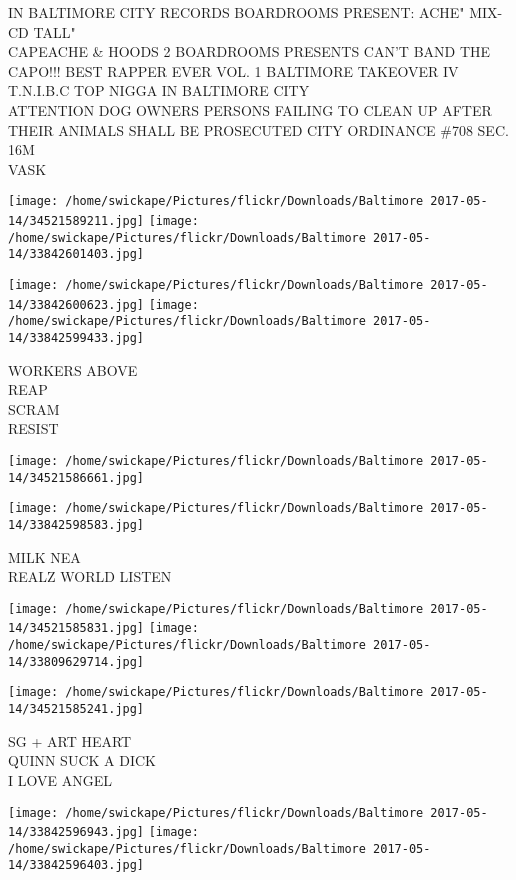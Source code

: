 \documentclass[10pt,letterpaper]{article}
\begin{document}
IN BALTIMORE CITY RECORDS BOARDROOMS PRESENT: ACHE" MIX{-}CD TALL"\\
CAPEACHE \& HOODS 2 BOARDROOMS PRESENTS CAN'T BAND THE CAPO!!! BEST RAPPER EVER VOL. 1 BALTIMORE TAKEOVER IV T.N.I.B.C TOP NIGGA IN BALTIMORE CITY\\
ATTENTION DOG OWNERS PERSONS FAILING TO CLEAN UP AFTER THEIR ANIMALS SHALL BE PROSECUTED CITY ORDINANCE \#708 SEC. 16M\\
VASK
\pagebreak

\texttt{[image: /home/swickape/Pictures/flickr/Downloads/Baltimore 2017-05-14/34521589211.jpg]}
\texttt{[image: /home/swickape/Pictures/flickr/Downloads/Baltimore 2017-05-14/33842601403.jpg]}

\texttt{[image: /home/swickape/Pictures/flickr/Downloads/Baltimore 2017-05-14/33842600623.jpg]}
\texttt{[image: /home/swickape/Pictures/flickr/Downloads/Baltimore 2017-05-14/33842599433.jpg]}

WORKERS ABOVE\\
REAP\\
SCRAM\\
RESIST
\pagebreak

\texttt{[image: /home/swickape/Pictures/flickr/Downloads/Baltimore 2017-05-14/34521586661.jpg]}

\vspace{0.25in}
\texttt{[image: /home/swickape/Pictures/flickr/Downloads/Baltimore 2017-05-14/33842598583.jpg]}

MILK NEA\\
REALZ WORLD LISTEN
\pagebreak

\texttt{[image: /home/swickape/Pictures/flickr/Downloads/Baltimore 2017-05-14/34521585831.jpg]}
\texttt{[image: /home/swickape/Pictures/flickr/Downloads/Baltimore 2017-05-14/33809629714.jpg]}

\vspace{0.25in}
\texttt{[image: /home/swickape/Pictures/flickr/Downloads/Baltimore 2017-05-14/34521585241.jpg]}

SG + ART HEART\\
QUINN SUCK A DICK\\
I LOVE ANGEL
\pagebreak

\texttt{[image: /home/swickape/Pictures/flickr/Downloads/Baltimore 2017-05-14/33842596943.jpg]}
\texttt{[image: /home/swickape/Pictures/flickr/Downloads/Baltimore 2017-05-14/33842596403.jpg]}
\end{document}

